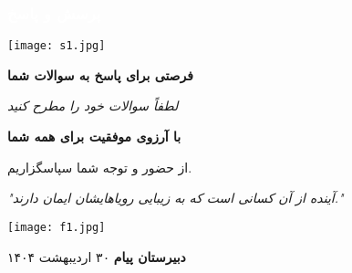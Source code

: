 \documentclass[aspectratio=169]{beamer}
\begin{document}
\begin{frame}[fragile]
  \frametitle{\textcolor{white}{\textbf{پرسش و پاسخ}}}

  \begin{center}
    \vspace{0.2cm}
    \texttt{[image: s1.jpg]}

    \vspace{0.2cm}
    \begin{block}{}
      \centering
      \Large\textbf{فرصتی برای پاسخ به سوالات شما}
    \end{block}

    \vspace{0.1cm}
    \normalsize\textit{لطفاً سوالات خود را مطرح کنید}
  \end{center}
\end{frame}

\begin{frame}[plain] %
  \centering %
  \vspace*{0.2cm} %

  \textcolor{myblue}{\Huge\textbf{با آرزوی موفقیت برای همه شما}}
  \vspace{0.5cm}

  \textcolor{mygold!90!black}{\Large از حضور و توجه شما سپاسگزاریم.} %
  \vspace{0.3cm}

  \begin{block}{} %
    \centering
    \Large\textit{"آینده از آن کسانی است که به زیبایی رویاهایشان ایمان دارند."}
  \end{block}
  \vspace{0.3cm}

  \texttt{[image: f1.jpg]}
  \vspace{0.3cm}

  \textcolor{mygold}{\Large\textbf{دبیرستان پیام}}
  \vspace{0.2cm}
  \textcolor{myblue!75!black}{\normalsize۳۰ اردیبهشت ۱۴۰۴}
\end{frame}

\end{document}
